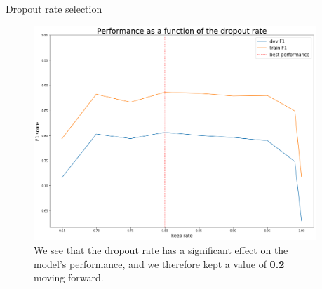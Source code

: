 \documentclass[final]{beamer}
\newlength{\onecolwid}
\newlength{\twocolwid}
\begin{document}
\begin{frame}[t]
\begin{columns}[t]
\begin{column}{\twocolwid}

\begin{columns}[t,totalwidth=\twocolwid] %

\begin{column}{\onecolwid} %


\begin{block}{Dropout rate selection}

\begin{figure}
\begin{center}
\includegraphics[width=600px]{figs/dr_graph.png}
\caption{We see that the dropout rate has a significant effect on the model's performance, and we therefore kept a value of \textbf{0.2} moving forward. }
\label{dr_graph}
\end{center}
\end{figure}

\end{block}


\end{column} %

\begin{column}{\onecolwid} %


\end{column}
\end{columns}
\end{column}
\end{columns}
\end{frame}
\end{document}
